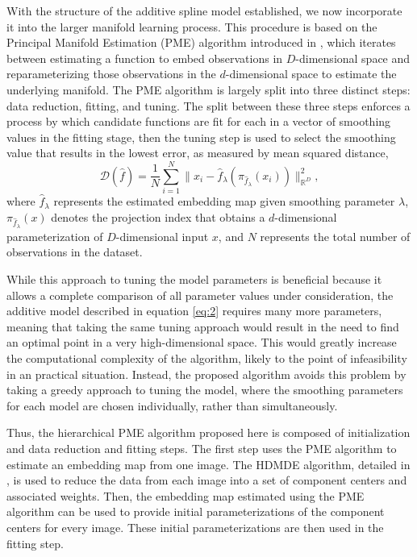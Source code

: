 \documentclass[11pt,reqno]{article}
\theoremstyle{definition}
\begin{document}
With the structure of the additive spline model established, we now incorporate it into the larger manifold learning process. This procedure is based on the Principal Manifold Estimation (PME) algorithm introduced in \cite{mengPrincipalManifoldEstimation2021}, which iterates between estimating a function to embed observations in $D$-dimensional space and reparameterizing those observations in the $d$-dimensional space to estimate the underlying manifold. The PME algorithm is largely split into three distinct steps: data reduction, fitting, and tuning. The split between these three steps enforces a process by which candidate functions are fit for each in a vector of smoothing values in the fitting stage, then the tuning step is used to select the smoothing value that results in the lowest error, as measured by mean squared distance,
\[%
  \mathcal{D}(\hat{f}) = \frac{1}{N}\sum_{i=1}^{N}\|x_i - \hat{f}_\lambda\left(\pi_{\hat{f}_\lambda}(x_i)\right)\|_{\mathbb{R}^{D}}^2
,\]%
where $\hat{f}_\lambda$ represents the estimated embedding map given smoothing parameter $\lambda$, $\pi_{\hat{f}_\lambda}(x)$ denotes the projection index that obtains a $d$-dimensional parameterization of $D$-dimensional input $x$, and $N$ represents the total number of observations in the dataset.

While this approach to tuning the model parameters is beneficial because it allows a complete comparison of all parameter values under consideration, the additive model described in equation \ref{eq:2} requires many more parameters, meaning that taking the same tuning approach would result in the need to find an optimal point in a very high-dimensional space. This would greatly increase the computational complexity of the algorithm, likely to the point of infeasibility in an practical situation. Instead, the proposed algorithm avoids this problem by taking a greedy approach to tuning the model, where the smoothing parameters for each model are chosen individually, rather than simultaneously. 

Thus, the hierarchical PME algorithm proposed here is composed of initialization and data reduction and fitting steps. The first step uses the PME algorithm to estimate an embedding map from one image. The HDMDE algorithm, detailed in \cite{mengPrincipalManifoldEstimation2021}, is used to reduce the data from each image into a set of component centers and associated weights. Then, the embedding map estimated using the PME algorithm can be used to provide initial parameterizations of the component centers for every image. These initial parameterizations are then used in the fitting step. 
\end{document}
